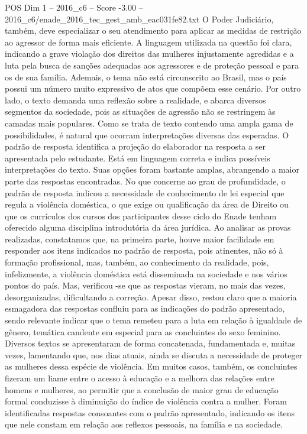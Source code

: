 \begin{textsample}{POS Dim 1 – 2016\_c6 – Score -3.00 – 2016\_c6/enade\_2016\_tec\_gest\_amb\_eac031fe82.txt}
O Poder Judiciário, também, deve especializar o seu atendimento para aplicar as medidas de restrição ao agressor de forma mais eficiente.
A linguagem utilizada na questão foi clara, indicando a grave violação dos direitos das mulheres injustamente agredidas e a luta pela busca de sanções adequadas aos agressores e de proteção pessoal e para os de sua família.
Ademais, o tema não está circunscrito ao Brasil, mas o país possui um número muito expressivo de atos que compõem esse cenário.
Por outro lado, o texto demanda uma reflexão sobre a realidade, e abarca diversos segmentos da sociedade, pois as situações de agressão não se restringem às camadas mais populares.
Como se trata de texto contendo uma ampla gama de possibilidades, é natural que ocorram interpretações diversas das esperadas.
O padrão de resposta identifica a projeção do elaborador na resposta a ser apresentada pelo estudante.
Está em linguagem correta e indica possíveis interpretações do texto.
Suas opções foram bastante amplas, abrangendo a maior parte das respostas encontradas.
No que concerne ao grau de profundidade, o padrão de resposta indicou a necessidade de conhecimento de lei especial que regula a violência doméstica, o que exige ou qualificação da área de Direito ou que os currículos dos cursos dos participantes desse ciclo do Enade tenham oferecido alguma disciplina introdutória da área jurídica.
Ao analisar as provas realizadas, constatamos que, na primeira parte, houve maior facilidade em responder aos itens indicados no padrão de resposta, pois atinentes, não só à formação profissional, mas, também, ao conhecimento da realidade, pois, infelizmente, a violência doméstica está disseminada na sociedade e nos vários pontos do país.
Mas, verificou -se que as respostas vieram, no mais das vezes, desorganizadas, dificultando a correção.
Apesar disso, restou claro que a maioria esmagadora das respostas confluiu para as indicações do padrão apresentado, sendo relevante indicar que o tema remeteu para a luta em relação à igualdade de gênero, temática candente em especial para as concluintes do sexo feminino.
Diversos textos se apresentaram de forma concatenada, fundamentada e, muitas vezes, lamentando que, nos dias atuais, ainda se discuta a necessidade de proteger as mulheres dessa espécie de violência.
Em muitos casos, também, os concluintes fizeram um liame entre o acesso à educação e a melhora das relações entre homens e mulheres, ao permitir que a conclusão de maior grau de educação formal conduzisse à diminuição do índice de violência contra a mulher.
Foram identificadas respostas consoantes com o padrão apresentado, indicando os itens que nele constam em relação aos reflexos pessoais, na família e na sociedade.

\end{textsample}

